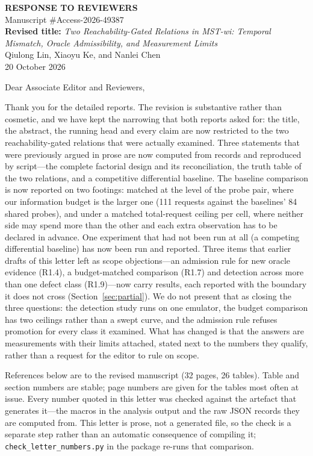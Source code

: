 \documentclass[10pt,letterpaper]{article}
\begin{document}
\begin{center}
{\large\bfseries RESPONSE TO REVIEWERS}\\[0.6ex]
{\normalsize Manuscript \#Access-2026-49387}\\[0.4ex]
{\normalsize \textbf{Revised title:} \emph{Two Reachability-Gated Relations in MST-wi:
Temporal Mismatch, Oracle Admissibility, and Measurement Limits}}\\[0.4ex]
{\normalsize Qiulong Lin, Xiaoyu Ke, and Nanlei Chen}\\[0.4ex]
{\normalsize 20 October 2026}
\end{center}

\vspace{0.5ex}
\noindent Dear Associate Editor and Reviewers,

Thank you for the detailed reports. The revision is substantive rather than
cosmetic, and we have kept the narrowing that both reports asked for: the title,
the abstract, the running head and every claim are now restricted to the two
reachability-gated relations that were actually examined. Three statements that
were previously argued in prose are now computed from records and reproduced by
script---the complete factorial design and its reconciliation, the truth table of
the two relations, and a competitive differential baseline. The baseline
comparison is now reported on two footings: matched at the level of the probe
pair, where our information budget is the larger one (111 requests against the
baselines' 84 shared probes), and under a matched total-request ceiling per
cell, where neither side may spend more than the other and each extra
observation has to be declared in advance. One experiment that had not been run
at all (a competing differential
baseline) has now been run and reported. Three items that earlier drafts of this
letter left as scope objections---an admission rule for new oracle evidence
(R1.4), a budget-matched comparison (R1.7) and detection across more than one
defect class (R1.9)---now carry results, each reported with the boundary it does
not cross (Section~\ref{sec:partial}). We do not present that as closing the three
questions: the detection study runs on one emulator, the budget comparison has two
ceilings rather than a swept curve, and the admission rule refuses promotion for
every class it examined. What has changed is that the answers are measurements
with their limits attached, stated next to the numbers they qualify, rather than a
request for the editor to rule on scope.

References below are to the revised manuscript (32 pages, 26 tables). Table and
section numbers are stable; page numbers are given for the tables most often at
issue. Every number quoted in this letter was checked against the artefact that
generates it---the macros in the analysis output and the raw JSON records they
are computed from. This letter is prose, not a generated file, so the check is
a separate step rather than an automatic consequence of compiling it;
\texttt{check\_letter\_numbers.py} in the package re-runs that comparison.
\end{document}

